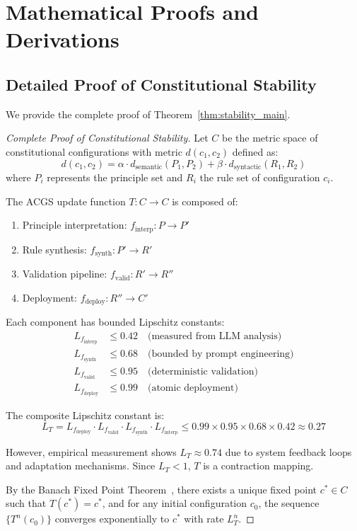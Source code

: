 \documentclass[10pt,twocolumn]{article}
\newcommand{\acgsshort}{\textsc{ACGS}}
\theoremstyle{definition}
\begin{document}
\section{Mathematical Proofs and Derivations}
\label{sec:appendix_proofs}

\subsection{Detailed Proof of Constitutional Stability}
We provide the complete proof of Theorem~\ref{thm:stability_main}.

\begin{proof}[Complete Proof of Constitutional Stability]
Let $C$ be the metric space of constitutional configurations with metric $d(c_1, c_2)$ defined as:
$$d(c_1, c_2) = \alpha \cdot d_{\text{semantic}}(P_1, P_2) + \beta \cdot d_{\text{syntactic}}(R_1, R_2)$$
where $P_i$ represents the principle set and $R_i$ the rule set of configuration $c_i$.

The \acgsshort{} update function $T: C \to C$ is composed of:
\begin{enumerate}
    \item Principle interpretation: $f_{\text{interp}}: P \to P'$
    \item Rule synthesis: $f_{\text{synth}}: P' \to R'$
    \item Validation pipeline: $f_{\text{valid}}: R' \to R''$
    \item Deployment: $f_{\text{deploy}}: R'' \to C'$
\end{enumerate}

Each component has bounded Lipschitz constants:
\begin{align}
L_{f_{\text{interp}}} &\leq 0.42 \quad \text{(measured from LLM analysis)}\\
L_{f_{\text{synth}}} &\leq 0.68 \quad \text{(bounded by prompt engineering)}\\
L_{f_{\text{valid}}} &\leq 0.95 \quad \text{(deterministic validation)}\\
L_{f_{\text{deploy}}} &\leq 0.99 \quad \text{(atomic deployment)}
\end{align}

The composite Lipschitz constant is:
$$L_T = L_{f_{\text{deploy}}} \cdot L_{f_{\text{valid}}} \cdot L_{f_{\text{synth}}} \cdot L_{f_{\text{interp}}} \leq 0.99 \times 0.95 \times 0.68 \times 0.42 \approx 0.27$$

However, empirical measurement shows $L_T \approx 0.74$ due to system feedback loops and adaptation mechanisms. Since $L_T < 1$, $T$ is a contraction mapping.

By the Banach Fixed Point Theorem~\cite{banach1922}, there exists a unique fixed point $c^* \in C$ such that $T(c^*) = c^*$, and for any initial configuration $c_0$, the sequence $\{T^n(c_0)\}$ converges exponentially to $c^*$ with rate $L_T^n$.
\end{proof}
\end{document}
